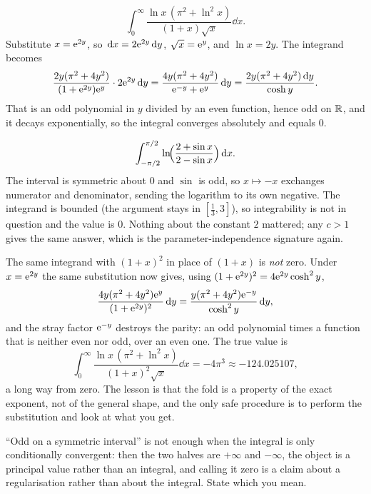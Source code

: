 \begin{worked}
\[\int_0^{\infty}\frac{\ln x\,(\pi^{2}+\ln^{2}x)}{(1+x)\sqrt{x}}\dd x.\]
Substitute $x=\mathrm{e}^{2y}$, so $\,\mathrm{d} x=2\mathrm{e}^{2y}\,\mathrm{d} y$, $\sqrt x=\mathrm{e}^{y}$, and $\ln x=2y$. The integrand becomes
\[\frac{2y(\pi^{2}+4y^{2})}{(1+\mathrm{e}^{2y})\mathrm{e}^{y}}\cdot2\mathrm{e}^{2y}\,\mathrm{d} y=\frac{4y(\pi^{2}+4y^{2})}{\mathrm{e}^{-y}+\mathrm{e}^{y}}\,\mathrm{d} y=\frac{2y(\pi^{2}+4y^{2})\,\mathrm{d} y}{\cosh y}.\]
That is an odd polynomial in $y$ divided by an even function, hence odd on $\mathbb{R}$, and it decays exponentially, so the integral converges absolutely and equals $0$.
\end{worked}

\begin{worked}
\[\int_{-\pi/2}^{\pi/2}\ln\!\Bigl(\frac{2+\sin x}{2-\sin x}\Bigr)\,\mathrm{d} x.\]
The interval is symmetric about $0$ and $\sin$ is odd, so $x\mapsto-x$ exchanges numerator and denominator, sending the logarithm to its own negative. The integrand is bounded (the argument stays in $[\tfrac13,3]$), so integrability is not in question and the value is $0$. Nothing about the constant $2$ mattered; any $c>1$ gives the same answer, which is the parameter-independence signature again.
\end{worked}

\begin{keynote}
The same integrand with $(1+x)^{2}$ in place of $(1+x)$ is \emph{not} zero. Under $x=\mathrm{e}^{2y}$ the same substitution now gives, using $(1+\mathrm{e}^{2y})^{2}=4\mathrm{e}^{2y}\cosh^{2}y$,
\[\frac{4y(\pi^{2}+4y^{2})\mathrm{e}^{y}}{(1+\mathrm{e}^{2y})^{2}}\,\mathrm{d} y=\frac{y(\pi^{2}+4y^{2})\mathrm{e}^{-y}}{\cosh^{2}y}\,\mathrm{d} y,\]
and the stray factor $\mathrm{e}^{-y}$ destroys the parity: an odd polynomial times a function that is neither even nor odd, over an even one. The true value is
\[\int_0^{\infty}\frac{\ln x\,(\pi^{2}+\ln^{2}x)}{(1+x)^{2}\sqrt{x}}\dd x=-4\pi^{3}\approx-124.025107,\]
a long way from zero. The lesson is that the fold is a property of the exact exponent, not of the general shape, and the only safe procedure is to perform the substitution and look at what you get.
\end{keynote}

\begin{trap}
``Odd on a symmetric interval'' is not enough when the integral is only conditionally convergent: then the two halves are $+\infty$ and $-\infty$, the object is a principal value rather than an integral, and calling it zero is a claim about a regularisation rather than about the integral. State which you mean.
\end{trap}

